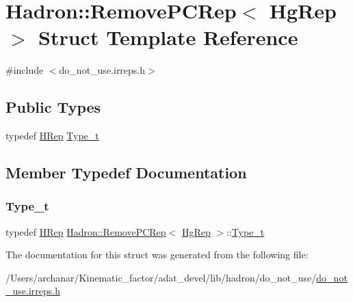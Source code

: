 \hypertarget{structHadron_1_1RemovePCRep_3_01HgRep_01_4}{}\section{Hadron\+:\+:Remove\+P\+C\+Rep$<$ Hg\+Rep $>$ Struct Template Reference}
\label{structHadron_1_1RemovePCRep_3_01HgRep_01_4}


{\ttfamily \#include $<$do\+\_\+not\+\_\+use.\+irreps.\+h$>$}

\subsection*{Public Types}
\begin{DoxyCompactItemize}
\item 
typedef \mbox{\hyperlink{structHadron_1_1HRep}{H\+Rep}} \mbox{\hyperlink{structHadron_1_1RemovePCRep_3_01HgRep_01_4_a85716e0795bf8043fb7f217c9cc34a0e}{Type\+\_\+t}}
\end{DoxyCompactItemize}


\subsection{Member Typedef Documentation}
\mbox{\label{structHadron_1_1RemovePCRep_3_01HgRep_01_4_a85716e0795bf8043fb7f217c9cc34a0e}} 
\subsubsection{\texorpdfstring{Type\_t}{Type\_t}}
{\footnotesize\ttfamily typedef \mbox{\hyperlink{structHadron_1_1HRep}{H\+Rep}} \mbox{\hyperlink{structHadron_1_1RemovePCRep}{Hadron\+::\+Remove\+P\+C\+Rep}}$<$ \mbox{\hyperlink{structHadron_1_1HgRep}{Hg\+Rep}} $>$\+::\mbox{\hyperlink{structHadron_1_1RemovePCRep_3_01HgRep_01_4_a85716e0795bf8043fb7f217c9cc34a0e}{Type\+\_\+t}}}



The documentation for this struct was generated from the following file\+:\begin{DoxyCompactItemize}
\item 
/\+Users/archanar/\+Kinematic\+\_\+factor/adat\+\_\+devel/lib/hadron/do\+\_\+not\+\_\+use/\mbox{\hyperlink{do__not__use_8irreps_8h}{do\+\_\+not\+\_\+use.\+irreps.\+h}}\end{DoxyCompactItemize}
